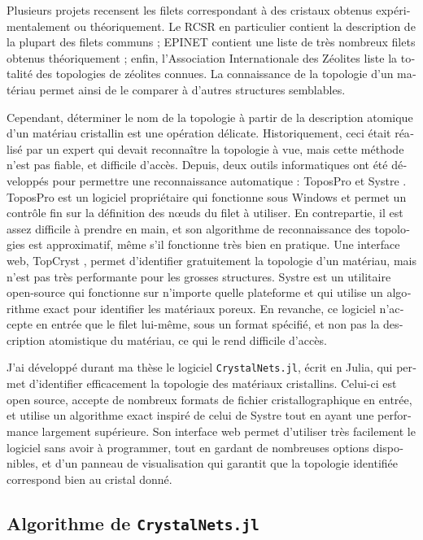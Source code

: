 \documentclass[thesis]{subfiles}
\begin{document}
\begin{otherlanguage}{french}
Plusieurs projets recensent les filets correspondant à des cristaux obtenus expérimentalement ou théoriquement. Le RCSR \autocite{RCSR} en particulier contient la description de la plupart des filets communs ; EPINET \autocite{EPINET} contient une liste de très nombreux filets obtenus théoriquement ; enfin, l'Association Internationale des Zéolites \autocite{IZA} liste la totalité des topologies de zéolites connues. La connaissance de la topologie d'un matériau permet ainsi de le comparer à d'autres structures semblables.

Cependant, déterminer le nom de la topologie à partir de la description atomique d'un matériau cristallin est une opération délicate. Historiquement, ceci était réalisé par un expert qui devait reconnaître la topologie à vue, mais cette méthode n'est pas fiable, et difficile d'accès. Depuis, deux outils informatiques ont été développés pour permettre une reconnaissance automatique : ToposPro \autocite{ToposPro,TopCryst} et Systre \autocite{Systre}. ToposPro est un logiciel propriétaire qui fonctionne sous Windows et permet un contrôle fin sur la définition des n\oe uds du filet à utiliser. En contrepartie, il est assez difficile à prendre en main, et son algorithme de reconnaissance des topologies est approximatif, même s'il fonctionne très bien en pratique. Une interface web, TopCryst \autocite{TopCryst}, permet d'identifier gratuitement la topologie d'un matériau, mais n'est pas très performante pour les grosses structures. Systre est un utilitaire open-source qui fonctionne sur n'importe quelle plateforme et qui utilise un algorithme exact pour identifier les matériaux poreux. En revanche, ce logiciel n'accepte en entrée que le filet lui-même, sous un format spécifié, et non pas la description atomistique du matériau, ce qui le rend difficile d'accès.

J'ai développé durant ma thèse le logiciel \texttt{CrystalNets.jl}, écrit en Julia, qui permet d'identifier efficacement la topologie des matériaux cristallins. Celui-ci est open source, accepte de nombreux formats de fichier cristallographique en entrée, et utilise un algorithme exact inspiré de celui de Systre tout en ayant une performance largement supérieure. Son interface web permet d'utiliser très facilement le logiciel sans avoir à programmer, tout en gardant de nombreuses options disponibles, et d'un panneau de visualisation qui garantit que la topologie identifiée correspond bien au cristal donné.

\subsection{Algorithme de \texttt{CrystalNets.jl}}


\end{otherlanguage}
\end{document}
